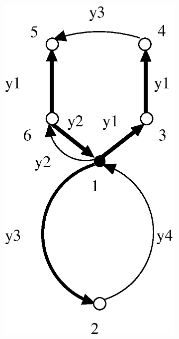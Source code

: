 \documentclass[a4paper,12pt]{article}
\numberwithin{equation}{section}
\numberwithin{figure}{section}
\begin{document}
\begin{figure}
\begin{center}




\begin{subfigure}[b]{.3\columnwidth}
\includegraphics[scale=.52]{stallh2.eps}

\end{subfigure}
\end{center}
\end{figure}
\end{document}
